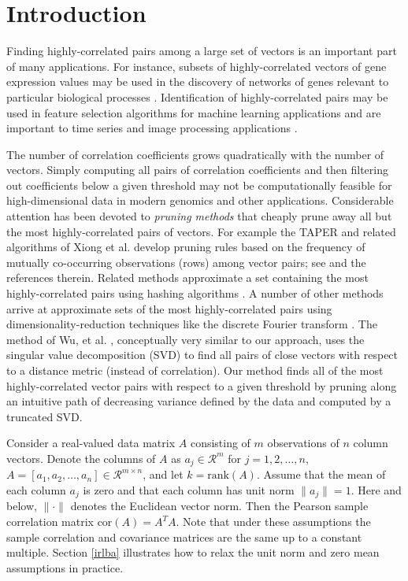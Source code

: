 \documentclass{article}
\numberwithin{algorithmctr}{section}
\begin{document}
\section{Introduction}\label{intro}

Finding highly-correlated pairs among a large set of vectors is an important
part of many applications. For instance, subsets of highly-correlated vectors
of gene expression values may be used in the discovery of networks of genes
relevant to particular biological processes \cite{genomics}.  Identification of
highly-correlated pairs may be used in feature selection algorithms for machine
learning applications \cite{ml1, ml2} and are important to time series and
image processing applications \cite{timeseries, svd-similarity}.

The number of correlation coefficients grows quadratically with the number of
vectors. Simply computing all pairs of correlation coefficients and then
filtering out coefficients below a given threshold may not be computationally
feasible for high-dimensional data in modern genomics and other applications.
Considerable attention has been devoted to \emph{pruning
methods} that cheaply prune away all but the most highly-correlated pairs of
vectors.  For example the TAPER and related algorithms of Xiong et al. develop
pruning rules based on the frequency of mutually co-occurring observations (rows)
among vector pairs; see \cite{prune1, prune2} and the references therein.
Related methods approximate a set containing the most highly-correlated
pairs using hashing algorithms \cite{prune3}. A number of other methods arrive
at approximate sets of the most highly-correlated pairs using
dimensionality-reduction techniques like the discrete Fourier
transform \cite{timeseries}. The method of Wu, et al. \cite{svd-similarity},
conceptually very similar to our approach, uses the singular value
decomposition (SVD) to find all pairs of close vectors with respect to a
distance metric (instead of correlation).  Our method finds all of the most
highly-correlated vector pairs with respect to a given threshold by pruning
along an intuitive path of decreasing variance defined by the data and computed
by a truncated SVD.

Consider a real-valued data matrix $A$ consisting of $m$ observations of $n$
column vectors.  Denote the columns of $A$ as $a_j\in\mathcal{R}^m$ for
$j=1,2,\ldots,n$, $A=[a_1, a_2, \ldots, a_n]\in\mathcal{R}^{m\times n}$, and
let $k=\mathrm{rank}(A)$.  Assume that the mean of each column $a_j$ is zero
and that each column has unit norm $\|a_j\| = 1$. Here and below, $\|\cdot\|$
denotes the Euclidean vector norm. Then the Pearson sample correlation matrix
$\mathrm{cor}(A)=A^TA$.  Note that under these assumptions the sample
correlation and covariance matrices are the same up to a constant multiple.
Section \ref{irlba} illustrates how to relax the unit norm and zero mean
assumptions in practice.
\end{document}
